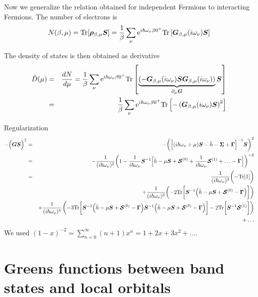 \documentclass[11pt,a4paper]{report}
\begin{document}
Now we generalize the relation obtained for independent Fermions to
interacting Fermions. The number of electrons is
\begin{eqnarray}
N(\beta,\mu)=\mathrm{Tr}[\bm{\rho}_{\beta,\mu}\bm{S}]
=\frac{1}{\beta}\sum_\nu\mathrm{e}^{i\hbar\omega_\nu\beta0^+}
\mathrm{Tr}\left[\bm{G}_{\beta,\mu}(i\omega_\nu)\bm{S}\right]
\end{eqnarray}

The density of states is then obtained as derivative
\begin{eqnarray}
\tilde{D}(\mu)&=&\frac{dN}{d\mu}=
\frac{1}{\beta}\sum_\nu\mathrm{e}^{i\hbar\omega_\nu\beta0^+}
\mathrm{Tr}\left[
\underbrace{
\left(-\bm{G}_{\beta,\mu}(i\omega_\nu)\bm{S}
\bm{G}_{\beta,\mu}(i\omega_\nu)\right)}_{\partial_\mu \bm{G}}
\bm{S}\right]
\nonumber\\
&=&\frac{1}{\beta}\sum_\nu\mathrm{e}^{i\hbar\omega_\nu\beta0^+}
\mathrm{Tr}\left[-
\left(\bm{G}_{\beta,\mu}(i\omega_\nu)\bm{S}\right)^2\right]
\end{eqnarray}


Regularization
\begin{eqnarray}
-\Bigl(\bm{G}\bm{S}\Bigr)^2
&=&
-\biggl(\Bigl[(i\hbar\omega_\nu+\mu)\bm{S}-\bar{h}-\bm{\Sigma}+\bm{\Gamma}\Bigr]^{-1}
\bm{S}\biggr)^2
\nonumber\\
&=&
-\frac{1}{(i\hbar\omega_\nu)^2}
\biggl(1-\frac{1}{i\hbar\omega_\nu}\bm{S}^{-1}
\Bigl[\bar{h}-\mu\bm{S}+\bm{\mathcal{S}}^{(0)}
+\frac{1}{i\hbar\omega_\nu}\bm{\mathcal{S}}^{(1)}+\ldots-\bm{\Gamma}\Bigr]
\biggr)^{-2}
\nonumber\\
&=&
\frac{1}{(i\hbar\omega_\nu)^3}\biggl(-\mathrm{Tr}[1]\biggr)
\nonumber\\
&&+\frac{1}{(i\hbar\omega_\nu)^3}
\biggl(-2\mathrm{Tr}\biggl[\bm{S}^{-1}\Bigl(\bar{h}-\mu\bm{S}+\bm{\mathcal{S}}^{(0)}
-\bm{\Gamma}\Bigr)\biggr]\biggr)
\nonumber\\
&&
+\frac{1}{(i\hbar\omega_\nu)^4}
\left(-3\mathrm{Tr}\biggl[
\bm{S}^{-1}\Bigl(\bar{h}-\mu\bm{S}+\bm{\mathcal{S}}^{(0)}-\bm{\Gamma}\Bigr)
\bm{S}^{-1}\Bigl(\bar{h}-\mu\bm{S}+\bm{\mathcal{S}}^{(0)}-\bm{\Gamma}\Bigr)
\biggr]
-2\mathrm{Tr}\biggr[
\bm{S}^{-1}\bm{\mathcal{S}}^{(1)}\biggr]\right)
\nonumber\\
&&+\ldots
\end{eqnarray}
We used $(1-x)^{-2}=\sum_{n=0}^\infty (n+1)x^n=1+2x+3x^2+\ldots$.

\section{Greens functions between band states and local orbitals}
\end{document}
